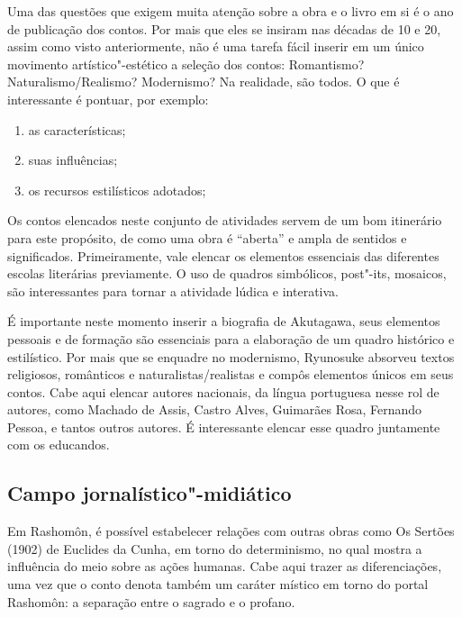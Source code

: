 \documentclass[12pt]{extarticle}
\begin{document}
Uma das questões que exigem muita atenção sobre a obra e o livro em si é o ano
de publicação dos contos. Por mais que eles se insiram nas décadas de 10 e 20,
assim como visto anteriormente, não é uma tarefa fácil inserir em um único
movimento artístico"-estético a seleção dos contos: Romantismo?
Naturalismo/Realismo? Modernismo? Na realidade, são todos. O que é interessante
é pontuar, por exemplo:

\begin{enumerate} \item as características; \item suas influências; \item os
recursos estilísticos adotados; \end{enumerate}

Os contos elencados neste conjunto de atividades servem de um bom itinerário
para este propósito, de como uma obra é ``aberta'' e ampla de sentidos e
significados. Primeiramente, vale elencar os elementos essenciais das
diferentes escolas literárias previamente. O uso de quadros simbólicos,
post"-its, mosaicos, são interessantes para tornar a atividade lúdica e
interativa.

É importante neste momento inserir a biografia de Akutagawa, seus elementos
pessoais e de formação são essenciais para a elaboração de um quadro histórico
e estilístico. Por mais que se enquadre no modernismo, Ryunosuke absorveu
textos religiosos, românticos e naturalistas/realistas e compôs elementos
únicos em seus contos. Cabe aqui elencar autores nacionais, da língua
portuguesa nesse rol de autores, como Machado de Assis, Castro Alves, Guimarães
Rosa, Fernando Pessoa, e tantos outros autores. É interessante elencar esse
quadro juntamente com os educandos.


\subsection{Campo jornalístico"-midiático}


Em Rashomôn, é possível estabelecer relações com outras obras como Os Sertões
(1902) de Euclides da Cunha, em torno do determinismo, no qual mostra a
influência do meio sobre as ações humanas. Cabe aqui trazer as diferenciações,
uma vez que o conto denota também um caráter místico em torno do portal
Rashomôn: a separação entre o sagrado e o profano.
\end{document}
